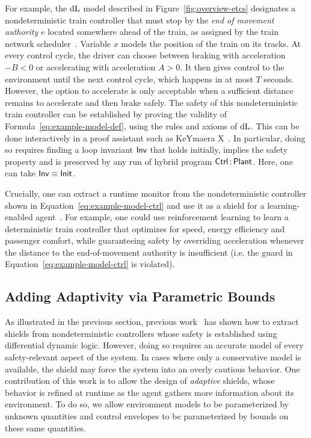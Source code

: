\documentclass[acmsmall,screen,nonacm]{acmart}
\begin{document}
For example, the $\mathop{}\!\mathrm{d} \text{L}$ model described in Figure~\ref{fig:overview-etcs} designates a nondeterministic train controller that must stop by the \emph{end of movement authority} $e$ located somewhere ahead of the train, as assigned by the train network scheduler~\cite{DBLP:conf/hybrid/PlatzerQ08}. Variable $x$ models the position of the train on its tracks. At every control cycle, the driver can choose between braking with acceleration $-B < 0$ or accelerating with acceleration $A > 0$. It then gives control to the environment until the next control cycle, which happens in at most $T$ seconds. However, the option to accelerate is only acceptable when a sufficient distance remains to accelerate and then brake safely. The safety of this nondeterministic train controller can be established by proving the validity of Formula~\ref{eq:example-model-def}, using the rules and axioms of $\mathop{}\!\mathrm{d} \text{L}$. This can be done interactively in a proof assistant such as KeYmaera X~\cite{DBLP:conf/cade/FultonMQVP15}. In particular, doing so requires finding a loop invariant $\mathsf{Inv}$ that holds initially, implies the safety property and is preserved by any run of hybrid program $\mathsf{Ctrl} \operatorname*{;} \mathsf{Plant}$. Here, one can take $\mathsf{Inv} \equiv \mathsf{Init}$.



Crucially, one can extract a runtime monitor from the nondeterministic controller shown in Equation~\ref{eq:example-model-ctrl} and use it as a shield for a learning-enabled agent~\cite{DBLP:conf/aaai/FultonP18}. For example, one could use reinforcement learning to learn a deterministic train controller that optimizes for speed, energy efficiency and passenger comfort, while guaranteeing safety by overriding acceleration whenever the distance to the end-of-movement authority is insufficient (i.e. the guard in Equation~\ref{eq:example-model-ctrl} is violated).



\subsection{Adding Adaptivity via Parametric Bounds}

As illustrated in the previous section, previous work~\cite{DBLP:journals/fmsd/MitschP16,DBLP:conf/aaai/FultonP18} has shown how to extract shields from nondeterministic controllers whose safety is established using differential dynamic logic. However, doing so requires an accurate model of every safety-relevant aspect of the system. In cases where only a conservative model is available, the shield may force the system into an overly cautious behavior. One contribution of this work is to allow the design of \emph{adaptive} shields, whose behavior is refined at runtime as the agent gathers more information about its environment. To do so, we allow environment models to be parameterized by unknown quantities and control envelopes to be parameterized by bounds on these same quantities.
\end{document}
